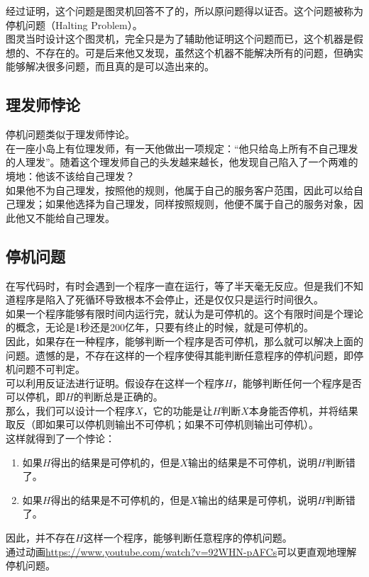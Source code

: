 经过证明，这个问题是图灵机回答不了的，所以原问题得以证否。这个问题被称为停机问题（Halting Problem）。\\

图灵当时设计这个图灵机，完全只是为了辅助他证明这个问题而已，这个机器是假想的、不存在的。可是后来他又发现，虽然这个机器不能解决所有的问题，但确实能够解决很多问题，而且真的是可以造出来的。\\

\subsection{理发师悖论}

停机问题类似于理发师悖论。\\

在一座小岛上有位理发师，有一天他做出一项规定：“他只给岛上所有不自己理发的人理发”。随着这个理发师自己的头发越来越长，他发现自己陷入了一个两难的境地：他该不该给自己理发？\\

如果他不为自己理发，按照他的规则，他属于自己的服务客户范围，因此可以给自己理发；如果他选择为自己理发，同样按照规则，他便不属于自己的服务对象，因此他又不能给自己理发。\\

\subsection{停机问题}

在写代码时，有时会遇到一个程序一直在运行，等了半天毫无反应。但是我们不知道程序是陷入了死循环导致根本不会停止，还是仅仅只是运行时间很久。\\

如果一个程序能够有限时间内运行完，就认为是可停机的。这个有限时间是个理论的概念，无论是1秒还是200亿年，只要有终止的时候，就是可停机的。\\

因此，如果存在一种程序，能够判断一个程序是否可停机，那么就可以解决上面的问题。遗憾的是，不存在这样的一个程序使得其能判断任意程序的停机问题，即停机问题不可判定。\\

可以利用反证法进行证明。假设存在这样一个程序$ H $，能够判断任何一个程序是否可以停机，即$ H $的判断总是正确的。\\

那么，我们可以设计一个程序$ X $，它的功能是让$ H $判断$ X $本身能否停机，并将结果取反（即如果可以停机则输出不可停机；如果不可停机则输出可停机）。\\

这样就得到了一个悖论：

\begin{enumerate}
    \item 如果$ H $得出的结果是可停机的，但是$ X $输出的结果是不可停机，说明$ H $判断错了。
    \item 如果$ H $得出的结果是不可停机的，但是$ X $输出的结果是可停机，说明$ H $判断错了。
\end{enumerate}

因此，并不存在$ H $这样一个程序，能够判断任意程序的停机问题。\\

通过动画\url{https://www.youtube.com/watch?v=92WHN-pAFCs}可以更直观地理解停机问题。

\newpage